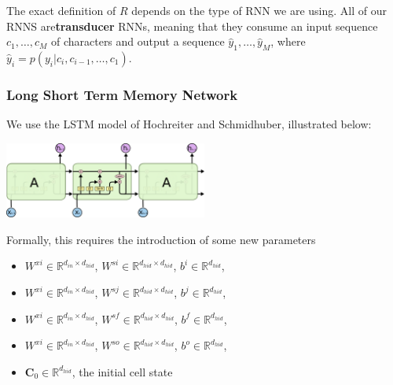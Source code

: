 \documentclass[11pt]{article}
\begin{document}
The exact definition of $R$ depends on the type of RNN we are using. All of our RNNS are\textbf{transducer} RNNs, meaning that they consume an input sequence $c_1, \dots, c_M$ of characters and output a sequence $\hat{y}_1, \dots, \hat{y}_M$, where $\hat{y}_i = p(y_i | c_i, c_{i-1}, \dots, c_1)$. 

\subsubsection{Long Short Term Memory Network}

We use the LSTM model of Hochreiter and Schmidhuber, illustrated below:

\begin{center}
  \includegraphics[width=0.5\textwidth]{LSTM3-chain.png}
\end{center}

Formally, this requires the introduction of some new parameters
\begin{itemize}
  \item $W^{xi} \in \mathbb{R}^{d_{in} \times d_{hid}}$, $W^{si} \in \mathbb{R}^{d_{hid} \times d_{hid}}$, $b^i \in \mathbb{R}^{d_{hid}}$, 
  \item $W^{xi} \in \mathbb{R}^{d_{in} \times d_{hid}}$, $W^{sj} \in \mathbb{R}^{d_{hid} \times d_{hid}}$, $b^j \in \mathbb{R}^{d_{hid}}$,
  \item $W^{xi} \in \mathbb{R}^{d_{in} \times d_{hid}}$, $W^{sf} \in \mathbb{R}^{d_{hid} \times d_{hid}}$, $b^f \in \mathbb{R}^{d_{hid}}$,
  \item $W^{xi} \in \mathbb{R}^{d_{in} \times d_{hid}}$, $W^{so} \in \mathbb{R}^{d_{hid} \times d_{hid}}$, $b^o \in \mathbb{R}^{d_{hid}}$,
  \item $\mathbf{C}_0 \in \mathbb{R}^{d_{hid}}$, the initial cell state
\end{itemize}
\end{document}
